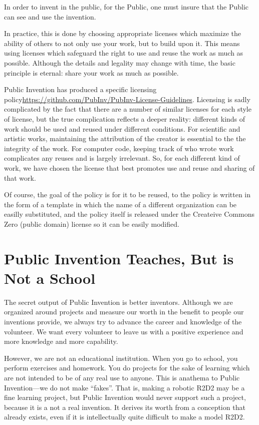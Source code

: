 \documentclass[
	fontsize=10pt, %
	twoside=false, %
	secnumdepth=1, %
]{kaobook}
\begin{document}
In order to invent in the public, for the Public, one must
insure that the Public can see and use the invention.

In practice, this is done by choosing appropriate licenses
which maximize the ability of others to not only use your work,
but to build upon it.
This means using licenses which safeguard the right to use and
reuse the work as much as possible.
Although the details and legality may change with time,
the basic principle is eternal: share your work as much as possible.

Public Invention has produced a specific licensing policy\url{https://github.com/PubInv/PubInv-License-Guidelines}.
Licensing is sadly complicated by the fact that there are a number of similar licenses for
each style of license,
but the true complication reflects a deeper reality: different kinds
of work should be used and reused under different conditions.
For scientific and artistic works, maintaining the attribution of the creator is essential
to the the integrity of the work.
For computer code, keeping track of who wrote work complicates any reuses and
is largely irrelevant.
So, for each different kind of work, we have chosen the license that best promotes
use and reuse and sharing of that work.

Of course, the goal of the policy is for it to be reused, to the policy
is written in the form of a template in which the name of a different
organization can be easilly substituted, and the policy itself is released
under the Createive Commons Zero (public domain) license so it can be easily modified.

\section{Public Invention Teaches, But is Not a School}

The secret output of Public Invention is better inventors.
Although we are organized around projects and
measure our worth in the benefit to people our inventions provide,
we always try to advance the career and knowledge of the volunteer.
We want every volunteer to leave us with a positive experience
and more knowledge and more capability.

However, we are not an educational institution.
When you go to school, you perform exercises and homework.
You do projects for the sake of learning which are not
intended to be of any real use to anyone.
This is anathema to Public Invention---we do not make ``fakes''.
That is, making a robotic R2D2 may be a fine learning
project, but Public Invention would never support such
a project, because it is a not a real invention.
It derives its worth from a conception that already exists,
even if it is intellectually quite difficult to make a model R2D2.
\end{document}
